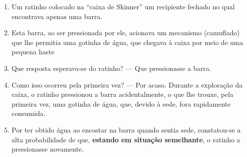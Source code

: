 \documentclass[
]{book}
\providecommand{\tightlist}{%
  \setlength{\itemsep}{0pt}\setlength{\parskip}{0pt}}
\begin{document}
\begin{enumerate}
\def\labelenumi{\arabic{enumi}.}
\tightlist
\item
  Um ratinho colocado na ``caixa de Skinner'' um recipiente fechado no
  qual encontrava apenas uma barra.
\item
  Esta barra, ao ser pressionada por ele, acionava um mecanismo
  (camuflado) que lhe permitia uma gotinha de água, que chegava à caixa
  por meio de uma pequena haste
\item
  Que resposta esperava-se do ratinho? --- Que pressionasse a barra.
\item
  Como isso ocorreu pela primeira vez? --- Por acaso. Durante a
  exploração da caixa, o ratinho pressionou a barra acidentalmente, o
  que lhe trouxe, pela primeira vez, uma gotinha de água, que, devido à
  sede, fora rapidamente consumida.
\item
  Por ter obtido água ao encostar na barra quando sentia sede,
  constatou-se a alta probabilidade de que, \textbf{estando em situação
  semelhante}, o ratinho a pressionasse novamente.
\end{enumerate}
\end{document}
